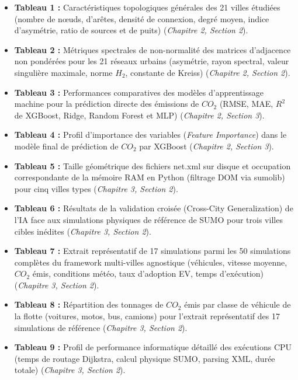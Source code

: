 \documentclass[10pt, a4paper]{article}
\providecommand{\tightlist}{}
\begin{document}
\begin{itemize}
\tightlist
\item
  \textbf{Tableau 1 :} Caractéristiques topologiques générales des 21
  villes étudiées (nombre de nœuds, d'arêtes, densité de connexion,
  degré moyen, indice d'asymétrie, ratio de sources et de puits)
  (\emph{Chapitre 2, Section 2}).
\item
  \textbf{Tableau 2 :} Métriques spectrales de non-normalité des
  matrices d'adjacence non pondérées pour les 21 réseaux urbains
  (asymétrie, rayon spectral, valeur singulière maximale, norme \(H_2\),
  constante de Kreiss) (\emph{Chapitre 2, Section 2}).
\item
  \textbf{Tableau 3 :} Performances comparatives des modèles
  d'apprentissage machine pour la prédiction directe des émissions de
  \(CO_2\) (RMSE, MAE, \(R^2\) de XGBoost, Ridge, Random Forest et MLP)
  (\emph{Chapitre 2, Section 3}).
\item
  \textbf{Tableau 4 :} Profil d'importance des variables (\emph{Feature
  Importance}) dans le modèle final de prédiction de \(CO_2\) par
  XGBoost (\emph{Chapitre 2, Section 3}).
\item
  \textbf{Tableau 5 :} Taille géométrique des fichiers net.xml sur
  disque et occupation correspondante de la mémoire RAM en Python
  (filtrage DOM via sumolib) pour cinq villes types (\emph{Chapitre 3,
  Section 2}).
\item
  \textbf{Tableau 6 :} Résultats de la validation croisée (Cross-City
  Generalization) de l'IA face aux simulations physiques de référence de
  SUMO pour trois villes cibles inédites (\emph{Chapitre 3, Section 2}).
\item
  \textbf{Tableau 7 :} Extrait représentatif de 17 simulations parmi les
  50 simulations complètes du framework multi-villes agnostique
  (véhicules, vitesse moyenne, \(CO_2\) émis, conditions météo, taux
  d'adoption EV, temps d'exécution) (\emph{Chapitre 3, Section 2}).
\item
  \textbf{Tableau 8 :} Répartition des tonnages de \(CO_2\) émis par
  classe de véhicule de la flotte (voitures, motos, bus, camions) pour
  l'extrait représentatif des 17 simulations de référence
  (\emph{Chapitre 3, Section 2}).
\item
  \textbf{Tableau 9 :} Profil de performance informatique détaillé des
  exécutions CPU (temps de routage Dijkstra, calcul physique SUMO,
  parsing XML, durée totale) (\emph{Chapitre 3, Section 2}).
\end{itemize}
\end{document}
